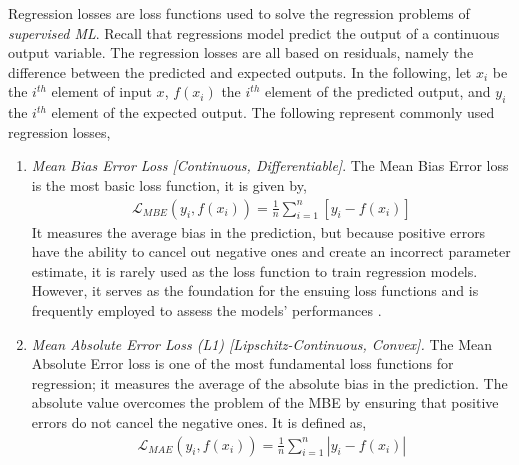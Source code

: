 \documentclass{article}
\begin{document}
  Regression losses are loss functions used to solve the regression problems of \textit{supervised ML}. Recall that regressions model predict the output of a continuous output variable. The regression losses are all based on residuals, namely the difference between the predicted and expected outputs. In the following, let $x_i$ be the $i^{th}$ element of input $x$, $f(x_i)$ the $i^{th}$ element of the predicted output, and $y_i$ the $i^{th}$ element of the expected output. The following represent commonly used regression losses,
  \begin{enumerate}
    \item \textit{Mean Bias Error Loss [Continuous, Differentiable]}. The Mean Bias Error loss is the most basic loss function, it is given by,
    \begin{equation}
      \begin{split}
        \mathcal{L}_{MBE} (y_i, f(x_i))= \frac{1}{n} \sum^{n}_{i=1} [y_i-f(x_i)]
      \end{split}
    \end{equation}
 It measures the average bias in the prediction, but because positive errors have the ability to cancel out negative ones and create an incorrect parameter estimate, it is rarely used as the loss function to train regression models. However, it serves as the foundation for the ensuing loss functions and is frequently employed to assess the models' performances \citep{ciampiconi2023survey}.
    \item \textit{Mean Absolute Error Loss (L1) [Lipschitz-Continuous, Convex].} The Mean Absolute Error loss is one of the most fundamental loss functions for regression; it measures the average of the absolute bias in the prediction. The absolute value overcomes the problem of the MBE by ensuring that positive errors do not cancel the negative ones. It is defined as, 
    \begin{equation}
      \begin{split}
        \mathcal{L}_{MAE}(y_i, f(x_i)) = \frac{1}{n} \sum^{n}_{i=1} |y_i-f(x_i)|
      \end{split}
    \end{equation}


\end{enumerate}
\end{document}

